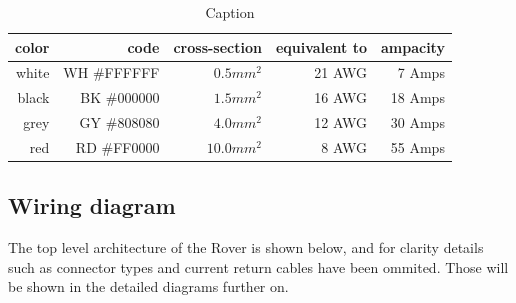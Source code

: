     \vspace{5mm} %
    
    \begin{table}[h] %
        \centering
        \begin{tabular}{|r|r|r|r|r|} \hline 
          color\footnotemark[1]& code\footnotemark[2]& cross-section\footnotemark[3]&  equivalent to\footnotemark[4]& ampacity\footnotemark[5] \\ \hline 
                          white&          WH \#FFFFFF&                    $0.5mm^2$&                          21 AWG&                7 Amps    \\ \hline 
                          black&          BK \#000000&                    $1.5mm^2$&                          16 AWG&               18 Amps    \\ \hline 
                           grey&          GY \#808080&                    $4.0mm^2$&                          12 AWG&               30 Amps    \\ \hline 
                            red&          RD \#FF0000&                   $10.0mm^2$&                           8 AWG&               55 Amps    \\ \hline
        \end{tabular}
        \caption{Caption}
        \label{color_codes}
    \end{table}


    \clearpage %

    \subsection{Wiring diagram}

    The top level architecture of the Rover is shown below, and for clarity details such as connector types and current return cables have been ommited. Those will be shown in the detailed diagrams further on. 

